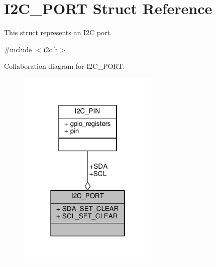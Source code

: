 \hypertarget{struct_i2_c___p_o_r_t}{}\section{I2\+C\+\_\+\+P\+O\+R\+T Struct Reference}
\label{struct_i2_c___p_o_r_t}


This struct represents an I2\+C port.  




{\ttfamily \#include $<$i2c.\+h$>$}



Collaboration diagram for I2\+C\+\_\+\+P\+O\+R\+T\+:\nopagebreak
\begin{figure}[H]
\begin{center}
\leavevmode
\includegraphics[width=190pt]{struct_i2_c___p_o_r_t__coll__graph}
\end{center}
\end{figure}
